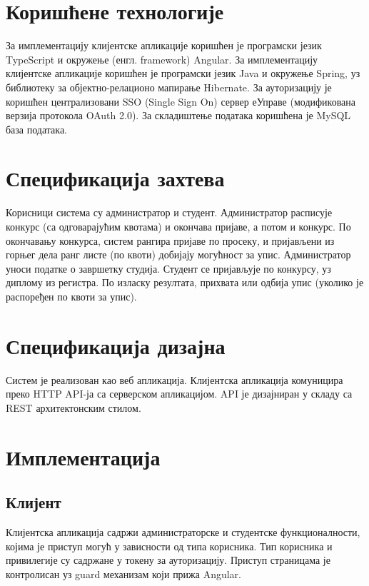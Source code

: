 \documentclass[a4paper]{article}
\begin{document}
\section*{Коришћене технологије}

За имплементацију клијентске апликације коришћен је програмски језик TypeScript\cite{typescript} и окружење (енгл. framework) Angular\cite{angular}.
За имплементацију клијентске апликације коришћен је програмски језик Java\cite{java} и окружење Spring\cite{spring}, уз библиотеку за објектно-релационо мапирање Hibernate\cite{hibernate}.
За ауторизацију је коришћен централизовани SSO (Single Sign On) сервер еУправе (модификована верзија протокола OAuth 2.0).
За складиштење података коришћена је MySQL\cite{mysql} база података.

\section*{Спецификација захтева}

Корисници система су администратор и студент. Администратор расписује конкурс (са одговарајућим квотама) и окончава пријаве,
а потом и конкурс. По окончавању конкурса, систем рангира пријаве по просеку, и пријављени из горњег дела ранг листе
(по квоти) добијају могућност за упис. Администратор уноси податке о завршетку студија. Студент се пријављује по конкурсу, уз диплому из регистра. По изласку резултата, прихвата или одбија упис (уколико је распоређен по квоти за упис).

\section*{Спецификација дизајна}

Систем је реализован као веб апликација. Клијентска апликација комуницира преко HTTP API-ја са серверском апликацијом. API је
дизајниран у складу са REST архитектонским стилом.

\section*{Имплементација}

\subsection*{Клијент}

Клијентска апликација садржи администраторске и студентске функционалности, којима је приступ могућ у зависности од
типа корисника. Тип корисника и привилегије су садржане у токену за ауторизацију. Приступ страницама је контролисан уз guard механизам који прижа Angular.
\end{document}
